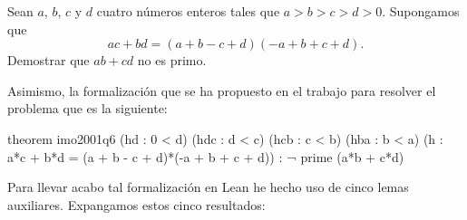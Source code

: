 \noindent
Sean \(a\), \(b\), \(c\) y \(d\) cuatro números enteros tales que
\(a > b > c > d > 0\). Supongamos que
\begin{equation}\label{ihipotesis}\tag{h}
  ac+bd = (a+b-c+d)(-a+b+c+d).
\end{equation}
Demostrar que \(ab+cd\) no es primo.

Asimismo, la formalización que se ha propuesto en el trabajo para
resolver el problema que es la siguiente:

\begin{leancode}
theorem imo2001q6
  (hd  : 0 < d)
  (hdc : d < c)
  (hcb : c < b)
  (hba : b < a)
  (h : a*c + b*d = (a + b - c + d)*(-a + b + c + d))
  : ¬ prime (a*b + c*d)
\end{leancode}

Para llevar acabo tal formalización en Lean he hecho uso de cinco lemas
auxiliares. Expangamos estos cinco resultados:
